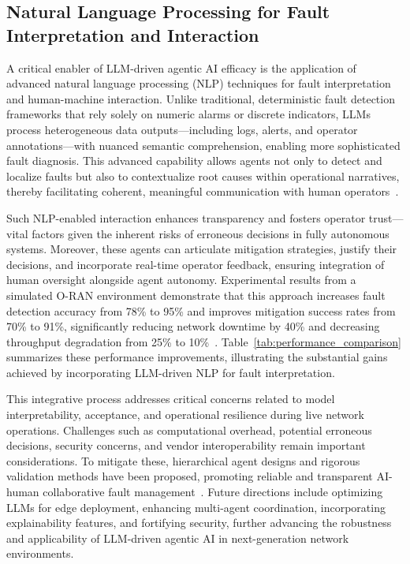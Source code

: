 \documentclass[sigconf]{acmart}
\begin{document}
\subsection{Natural Language Processing for Fault Interpretation and Interaction}

A critical enabler of LLM-driven agentic AI efficacy is the application of advanced natural language processing (NLP) techniques for fault interpretation and human-machine interaction. Unlike traditional, deterministic fault detection frameworks that rely solely on numeric alarms or discrete indicators, LLMs process heterogeneous data outputs—including logs, alerts, and operator annotations—with nuanced semantic comprehension, enabling more sophisticated fault diagnosis. This advanced capability allows agents not only to detect and localize faults but also to contextualize root causes within operational narratives, thereby facilitating coherent, meaningful communication with human operators~\cite{ref55}.

Such NLP-enabled interaction enhances transparency and fosters operator trust—vital factors given the inherent risks of erroneous decisions in fully autonomous systems. Moreover, these agents can articulate mitigation strategies, justify their decisions, and incorporate real-time operator feedback, ensuring integration of human oversight alongside agent autonomy. Experimental results from a simulated O-RAN environment demonstrate that this approach increases fault detection accuracy from 78\% to 95\% and improves mitigation success rates from 70\% to 91\%, significantly reducing network downtime by 40\% and decreasing throughput degradation from 25\% to 10\%~\cite{ref55}. Table~\ref{tab:performance_comparison} summarizes these performance improvements, illustrating the substantial gains achieved by incorporating LLM-driven NLP for fault interpretation.

This integrative process addresses critical concerns related to model interpretability, acceptance, and operational resilience during live network operations. Challenges such as computational overhead, potential erroneous decisions, security concerns, and vendor interoperability remain important considerations. To mitigate these, hierarchical agent designs and rigorous validation methods have been proposed, promoting reliable and transparent AI-human collaborative fault management~\cite{ref55}. Future directions include optimizing LLMs for edge deployment, enhancing multi-agent coordination, incorporating explainability features, and fortifying security, further advancing the robustness and applicability of LLM-driven agentic AI in next-generation network environments.
\end{document}

